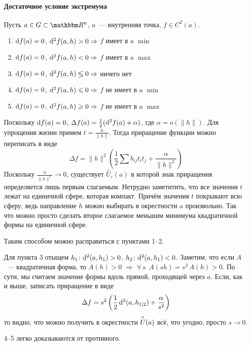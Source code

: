 \documentclass[12pt,timbord]{../../../notes}
\begin{document}
\paragraph{Достаточное условие экстремума}
\label{par:diffspace::extrema::suff}

\begin{thrm}\label{thrm:diffspace::extrema::suff}
  Пусть $a\in G \subset \R^n$, $a$~--- внутренняя точка, $f\in C^2(a)$.
  \begin{enumerate}
    \item $\mathrm{d} f(a) = 0$, $\mathrm{d}^2 f(a,h) > 0 \Rightarrow$ $f$ имеет в $a$ $\min$
    \item $\mathrm{d} f(a) = 0$, $\mathrm{d}^2 f(a,h) < 0 \Rightarrow$ $f$ имеет в $a$ $\max$
    \item $\mathrm{d} f(a) = 0$, $\mathrm{d}^2 f(a,h) \lessgtr 0 \Rightarrow$ ничего нет
    \item $\mathrm{d} f(a) = 0$, $\mathrm{d}^2 f(a,h) \leqslant 0 \Rightarrow$ $f$ не имеет в $a$ $\min$
    \item $\mathrm{d} f(a) = 0$, $\mathrm{d}^2 f(a,h) \geqslant 0 \Rightarrow$ $f$ не имеет в $a$ $\max$
  \end{enumerate}
\end{thrm}
\begin{ittproof}
  Поскольку $\mathrm{d} f(a) = 0$,  $\Delta f(a) = \frac 1 2 (\mathrm{d}^2 f(a) + \alpha)$, 
  где $\alpha = o(\|h\|)$. Для упрощения жизни примем $t=\frac{h}{\|h\|}$. Тогда приращение
  функции можно переписать в виде
  \[
    \Delta f  = \|h\|^2 \left( \frac{1}{2} \sum b_{ij} t_i t_j + \frac\alpha{\|h\|^2} \right)
  \]
  Поскольку $\frac{\alpha}{\|h\|^2} \to 0$, существует $\overset{\circ}{U}_\varepsilon (a)$ в которой 
  знак приращения определяется лишь первым слагаемым. Нетрудно заметитить, что все значения $t$
  лежат на единичной сфере, которая компакт. Причём значения $t$ покрывают всю сферу, ведь
  направление $h$ можно выбирать в окрестности $a$ произвольно. Так что можно просто сделать
  второе слагаемое меньшим минимума квадратичной формы на единичной сфере.

  Таким способом можно расправиться с пунктами 1--2. 

  Для пункта 3 отыщем $h_1 \colon \mathrm{d}^2(a, h_1) > 0$, $h_2 \colon \mathrm{d}^2(a, h_1) < 0$. Заметим,
  что если $A$~--- квадратичная форма, 
  то $A(h)>0$ $\Rightarrow$ $ \forall\,s \;\: A(sh)=s^2\,A(h) > 0 $. По сути, мы считаем значение
  формы вдоль прямой, проходящей через $a$. 
  Если, как и выше, записать приращение в виде
  \[
    \Delta f  = s^2 \left(\frac 1 2 \,\mathrm{d}^2 (a, h_{1|2}) + \frac\alpha{s^2}\right)
  \]
  то видно, что можно получить в окрестности $\overset{\circ}{U} (a) $ всё, что угодно, просто $s\to 0$.

  4--5 легко доказываются от противного.
\end{ittproof}
\end{document}
